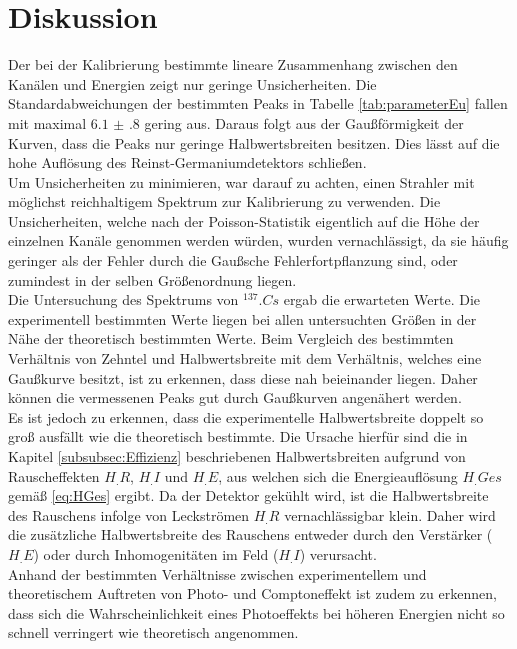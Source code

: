 
\section{Diskussion}
\label{sec:Diskussion}

Der bei der Kalibrierung bestimmte lineare Zusammenhang zwischen den Kanälen und Energien zeigt nur geringe Unsicherheiten. Die Standardabweichungen der bestimmten Peaks in Tabelle \ref{tab:parameterEu} fallen mit maximal $\num{6.1(8)}$ gering aus. Daraus folgt aus der Gaußförmigkeit der Kurven, dass die Peaks nur geringe Halbwertsbreiten besitzen. Dies lässt auf die hohe Auflösung des Reinst-Germaniumdetektors schließen.\\
Um Unsicherheiten zu minimieren, war darauf zu achten, einen Strahler mit möglichst reichhaltigem Spektrum zur Kalibrierung zu verwenden. Die Unsicherheiten, welche nach der Poisson-Statistik eigentlich auf die Höhe der einzelnen Kanäle genommen werden würden, wurden vernachlässigt, da sie häufig geringer als der Fehler durch die Gaußsche Fehlerfortpflanzung sind, oder zumindest in der selben Größenordnung liegen.\\
Die Untersuchung des Spektrums von $^{137}.{Cs}$ ergab die erwarteten Werte.
Die experimentell bestimmten Werte liegen bei allen untersuchten Größen in der Nähe der theoretisch bestimmten Werte.
Beim Vergleich des bestimmten Verhältnis von Zehntel und Halbwertsbreite mit dem Verhältnis, welches eine Gaußkurve besitzt, ist zu erkennen, dass diese nah beieinander liegen. Daher können die vermessenen Peaks gut durch Gaußkurven angenähert werden.\\
Es ist jedoch zu erkennen, dass die experimentelle Halbwertsbreite doppelt so groß ausfällt wie die theoretisch bestimmte. Die Ursache hierfür sind die in Kapitel \ref{subsubsec:Effizienz} beschriebenen Halbwertsbreiten aufgrund von Rauscheffekten $H_.R$, $H_.I$ und $H_.E$, aus welchen sich die Energieauflösung $H_.{Ges}$ gemäß \eqref{eq:HGes} ergibt. Da der Detektor gekühlt wird, ist die Halbwertsbreite des Rauschens infolge von Leckströmen $H_.R$ vernachlässigbar klein. Daher wird die zusätzliche Halbwertsbreite des Rauschens entweder durch den Verstärker ($H_.E$) oder durch Inhomogenitäten im Feld ($H_.I$) verursacht.\\
Anhand der bestimmten Verhältnisse zwischen experimentellem und theoretischem Auftreten von Photo- und Comptoneffekt ist zudem zu erkennen, dass sich die Wahrscheinlichkeit eines Photoeffekts bei höheren Energien nicht so schnell verringert wie theoretisch angenommen.
